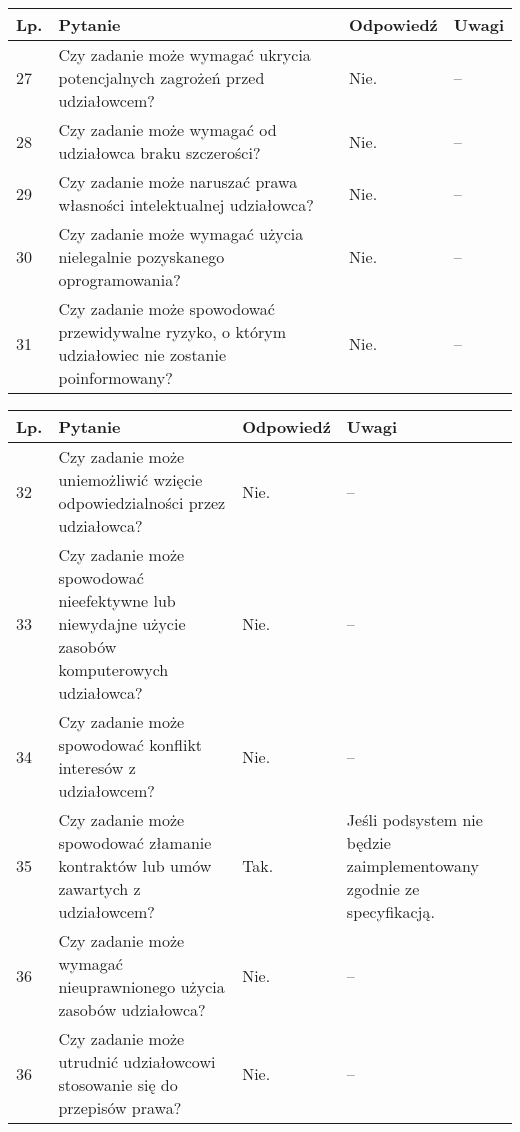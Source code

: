 \documentclass[11pt,oneside,a4paper,titlepage,onecolumn]{article}
\begin{document}
\begin{tabularx}{\textwidth}{|l|X|l|X|}
    \hline
    Lp. & Pytanie & Odpowiedź & Uwagi \\ \hline

	27
	& Czy zadanie może wymagać ukrycia potencjalnych zagrożeń przed udziałowcem?
	& Nie.
	& --
	\\\hline

	28
	& Czy zadanie może wymagać od udziałowca braku szczerości?
	& Nie.
	& --
	\\\hline

	29
	& Czy zadanie może naruszać prawa własności intelektualnej udziałowca?
	& Nie.
	& --
	\\\hline

	30
	& Czy zadanie może wymagać użycia nielegalnie pozyskanego oprogramowania?
	& Nie.
	& --
	\\\hline

	31
	& Czy zadanie może spowodować przewidywalne ryzyko, o którym udziałowiec nie
    zostanie poinformowany?
	& Nie.
	& --
	\\\hline
\end{tabularx}
	
\begin{tabularx}{\textwidth}{|l|X|l|X|}
    \hline
    Lp. & Pytanie & Odpowiedź & Uwagi \\ \hline
    
	32
	& Czy zadanie może uniemożliwić wzięcie odpowiedzialności przez udziałowca?
	& Nie.
	& --
	\\\hline

	33
	& Czy zadanie może spowodować nieefektywne lub niewydajne użycie zasobów
    komputerowych udziałowca?
	& Nie.
	& --
	\\\hline

	34
	& Czy zadanie może spowodować konflikt interesów z udziałowcem?
	& Nie.
	& --
	\\\hline

	35
	& Czy zadanie może spowodować złamanie kontraktów lub umów zawartych z
    udziałowcem?
	& Tak.
	& Jeśli podsystem nie będzie zaimplementowany zgodnie ze specyfikacją.
	\\\hline

	36
	& Czy zadanie może wymagać nieuprawnionego użycia zasobów udziałowca?
	& Nie.
	& --
	\\\hline

	36
	& Czy zadanie może utrudnić udziałowcowi stosowanie się do przepisów prawa?
	& Nie.
	& --
	\\\hline
\end{tabularx}
\end{document}
